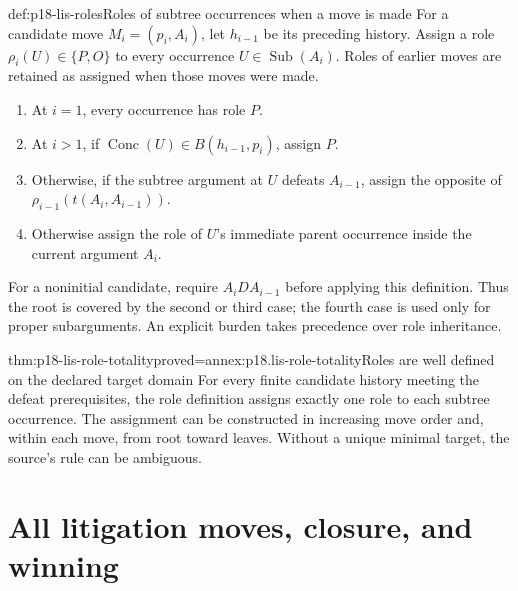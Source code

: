\begin{hbdefinition}{def:p18-lis-roles}{Roles of subtree occurrences when a move is made}
For a candidate move \(M_i=(p_i,A_i)\), let \(h_{i-1}\) be its
preceding history. Assign a role
\(\rho_i(U)\in\{P,O\}\) to every occurrence \(U\in\operatorname{Sub}(A_i)\).
Roles of earlier moves are retained as assigned when those moves
were made.
\begin{enumerate}
\item At \(i=1\), every occurrence has role \(P\).
\item At \(i>1\), if
\(\operatorname{Conc}(U)\in B(h_{i-1},p_i)\), assign \(P\).
\item Otherwise, if the subtree argument at \(U\) defeats \(A_{i-1}\),
assign the opposite of
\(\rho_{i-1}(t(A_i,A_{i-1}))\).
\item Otherwise assign the role of \(U\)'s immediate parent occurrence
inside the current argument \(A_i\).
\end{enumerate}
For a noninitial candidate, require \(A_iDA_{i-1}\) before applying
this definition. Thus the root is covered by the second or third
case; the fourth case is used only for proper subarguments.
An explicit burden takes precedence over role inheritance.
\end{hbdefinition}

\begin{hbtheorem}{thm:p18-lis-role-totality}{proved=annex:p18.lis-role-totality}{Roles are well defined on the declared target domain}
For every finite candidate history meeting the defeat prerequisites,
the role definition assigns exactly one role to each subtree occurrence.
The assignment can be constructed in increasing move order and,
within each move, from root toward leaves.
Without a unique minimal target, the source's rule can be ambiguous.
\end{hbtheorem}

\section{All litigation moves, closure, and winning}
\label{sec:p18-lis-game}

